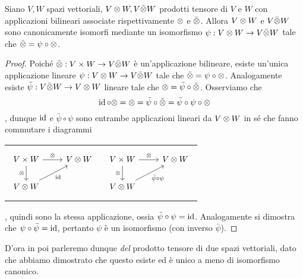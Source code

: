 \begin{proposition}
Siano $V\comma W$ spazi vettoriali, $V\otimes W,\allowbreak V\bar{\otimes} W$ prodotti tensore di $V$ e $W$ con applicazioni bilineari associate rispettivamente $\otimes$ e $\bar{\otimes}$. Allora $V\otimes W$ e $V\bar{\otimes} W$ sono canonicamente isomorfi mediante un isomorfismo $\psi:V\otimes W\to V\bar{\otimes} W$ tale che $\bar{\otimes}=\psi\circ\otimes$.
\end{proposition}
\begin{proof}Poiché $\bar{\otimes}:V\times W\to V\bar{\otimes} W$ è un'applicazione bilineare, esiste un'unica applicazione lineare $\psi:V\otimes W\to V\bar{\otimes} W$ tale che $\bar{\otimes}=\psi\circ\otimes$. Analogamente esiste $\bar\psi:V\bar{\otimes} W\to V\otimes W$ lineare tale che $\otimes=\bar\psi\circ\bar{\otimes}$. Osserviamo che
$$
\operatorname{id}\circ\otimes=\otimes=\bar\psi\circ\bar{\otimes}=\bar\psi\circ\psi\circ\otimes
$$
, dunque $\operatorname{id}$ e $\bar\psi\circ\psi$ sono entrambe applicazioni lineari da $V\otimes W$ in sé che fanno commutare i diagrammi\\
\begin{tabularx}{\textwidth}{XX}
$$
\begin{tikzcd}[ampersand replacement = \&]
V\times W\arrow[r,"\tensor"]\arrow[d,"\tensor",swap]\&V\tensor W\\
V\tensor W\arrow[ru,"\id",swap]
\end{tikzcd}
$$
&
$$
\begin{tikzcd}[ampersand replacement = \&]
V\times W\arrow[r,"\tensor"]\arrow[d,"\tensor",swap]\&V\tensor W\\
V\tensor W\arrow[ru,"\bar\psi\circ\psi",swap]
\end{tikzcd}
$$
\end{tabularx}
, quindi sono la stessa applicazione, ossia $\bar\psi\circ\psi=\operatorname{id}$. Analogamente si dimostra che $\psi\circ\bar\psi=\operatorname{id}$, pertanto $\psi$ è un isomorfismo (con inverso $\bar\psi$).
\end{proof}

D'ora in poi parleremo dunque \emph{del} prodotto tensore di due spazi vettoriali, dato che abbiamo dimostrato che questo esiste ed è unico a meno di isomorfismo canonico.

